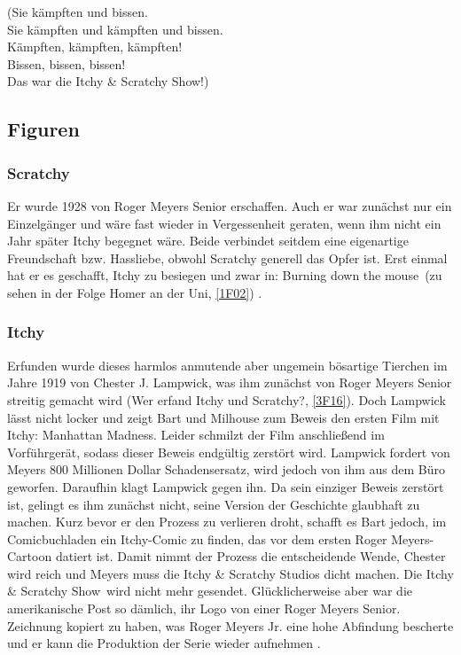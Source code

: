 \begin{appendix}
\begin{lyricquote}
    (Sie kämpften und bissen.\\
    Sie kämpften und kämpften und bissen.\\
    Kämpften, kämpften, kämpften!\\
    Bissen, bissen, bissen!\\
    Das war die Itchy \& Scratchy Show!) 
\end{lyricquote}


\subsection{Figuren}

\subsubsection{Scratchy}
Er wurde 1928 von Roger Meyers Senior erschaffen. Auch er war zunächst nur ein Einzelgänger und wäre fast wieder in Vergessenheit geraten, wenn ihm nicht ein Jahr später Itchy begegnet wäre. Beide verbindet seitdem eine eigenartige Freundschaft bzw. Hassliebe, obwohl Scratchy generell das Opfer ist. Erst einmal hat er es geschafft, Itchy zu besiegen und zwar in: \glqq Burning down the mouse\grqq\ (zu sehen in der Folge \glqq Homer an der Uni\grqq , \ref{1F02}) \cite{itchy}.


\subsubsection{Itchy}
Erfunden wurde dieses harmlos anmutende aber ungemein bösartige Tierchen im Jahre 1919 von Chester J. Lampwick, was ihm zunächst von Roger Meyers Senior streitig gemacht wird (\glqq Wer erfand Itchy und Scratchy?\grqq , \ref{3F16}). Doch Lampwick lässt nicht locker und zeigt Bart und Milhouse zum Beweis den ersten Film mit Itchy: \glqq Manhattan Madness\grqq . Leider schmilzt der Film anschließend im Vorführgerät, sodass dieser Beweis endgültig zerstört wird. Lampwick fordert von Meyers 800 Millionen Dollar Schadensersatz, wird jedoch von ihm aus dem Büro geworfen. Daraufhin klagt Lampwick gegen ihn. Da sein einziger Beweis zerstört ist, gelingt es ihm zunächst nicht, seine Version der Geschichte glaubhaft zu machen. Kurz bevor er den Prozess zu verlieren droht, schafft es Bart jedoch, im Comicbuchladen ein Itchy-Comic zu finden, das vor dem ersten Roger Meyers-Cartoon datiert ist. Damit nimmt der Prozess die entscheidende Wende, Chester wird reich und Meyers muss die Itchy \& Scratchy Studios dicht machen. Die \glqq Itchy \& Scratchy Show\grqq\ wird nicht mehr gesendet. Glücklicherweise aber war die amerikanische Post so dämlich, ihr Logo von einer Roger Meyers Senior. Zeichnung kopiert zu haben, was Roger Meyers Jr. eine hohe Abfindung bescherte und er kann die Produktion der Serie wieder aufnehmen \cite{itchy}. 



\end{appendix}
